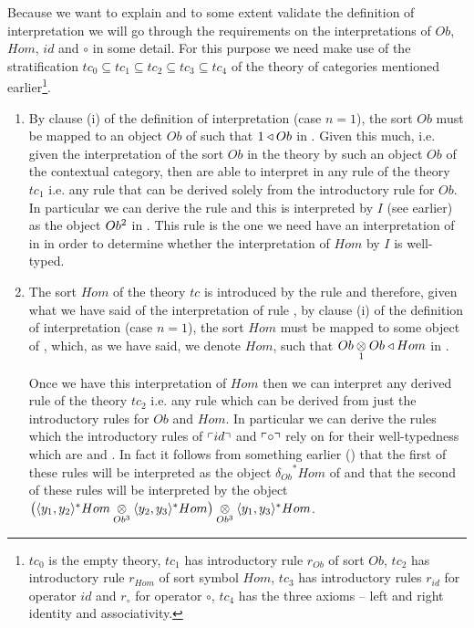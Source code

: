 Because we want to explain and to some extent validate the definition of interpretation we will go through the
requirements on the interpretations of $Ob$, $Hom$, $id$ and $\circ$ in some detail.  For this purpose we
need make use of the stratification 
$tc_0 \subseteq tc_1 \subseteq tc_2 \subseteq tc_3 \subseteq tc_4$
of the theory of categories mentioned earlier\footnote{$tc_0$ is the empty theory, $tc_1$ has introductory rule 
$r_{Ob}$ of sort $Ob$, $tc_2$ has introductory rule $r_{Hom}$ of sort symbol $Hom$, $tc_3$ has introductory rules
$r_{id}$ for operator $id$ and  $r_\circ$ for operator $\circ$, $tc_4$ has the three axioms -- left and right identity and associativity.}.


\begin{enumerate}[$tc_1$]
\item By clause (i) of the definition of interpretation (case $n=1$), the sort $Ob$ must be mapped to an object $Ob$ of \catcw such that $1 \base Ob$ in \catc. Given this much, i.e. given the interpretation of the sort $Ob$ in the theory by such an object $Ob$ of the contextual category, then are able to interpret in \catcw any rule of the theory $tc_1$ i.e. any rule that can be derived solely from the introductory rule for $Ob$. 
In particular we can derive the rule  
 and this is interpreted by $I$ (see earlier\commentary{\tbd})
 as the object $\OO$ in \catc . This rule is the one we need  have an interpretation of in \catcw in order to determine whether the interpretation of $Hom$ by $I$ is well-typed.

\item The sort $Hom$ of the theory $tc$ is introduced by the rule 
and therefore, given what we have said of the interpretation of rule 
, 
by clause (i) of the definition of interpretation (case $n=1$), the sort $Hom$ must be mapped to some object of \catc,  which, as we have said, we denote $Hom$, such that $\crossx{Ob}{Ob}{1} \base Hom$ in \catc.

Once we have this interpretation of $Hom$ then we can interpret any derived rule of the theory $tc_2$ i.e.
any rule which can be derived from just the introductory rules
for $Ob$ and $Hom$. In particular we can derive the rules which 
the introductory rules of $\qq{id}$ and $\qq{\circ}$ rely on for their
well-typedness which are  and
.
In fact it follows from something earlier (\tbd) that the first of these rules will be interpreted 
as the object ${\delta_{Ob}}^*Hom$ of \catcw and that the second of these rules will be interpreted by
the object $\yOOOfHgHHmapped$. 


\end{enumerate}
